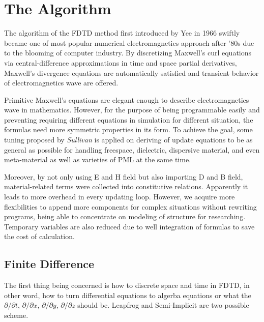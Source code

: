 \section{The Algorithm}
The algorithm of the FDTD method first introduced by Yee in 1966 swiftly became one of most popular numerical
electromagnetics approach after '80s due to the blooming of computer industry. By discretizing Maxwell's curl equations
via central-difference approximations in time and space partial derivatives, Maxwell's divergence equations are
automatically satisfied and transient behavior of electromagnetics wave are offered.

Primitive Maxwell's equations are elegant enough to describe electromagnetics wave in mathematics. However, for the
purpose of being programmable easily and preventing requiring different equations in simulation for different situation,
the formulas need more symmetric properties in its form. To achieve the goal, some tuning proposed by \textit{Sullivan}
is applied on deriving of update equations to be as general as possible for handling freespace, dielectric, dispersive
material, and even meta-material as well as varieties of PML at the same time.

Moreover, by not only using E and H field but also importing D and B field, material-related terms were collected into
constitutive relations. Apparently it leads to more overhead in every updating loop. However, we acquire more
flexibilities to append more components for complex situations without rewriting programs, being able to concentrate on
modeling of structure for researching. Temporary variables are also reduced due to well integration of formulas to save
the cost of calculation.


\subsection{Finite Difference}
The first thing being concerned is how to discrete space and time in FDTD, in other word, how to turn differential
equations to algerba equations or what the $\partial/\partial t$, $\partial/\partial x$, $\partial/\partial y$,
$\partial/\partial z$ should be. Leapfrog and Semi-Implicit are two possible scheme.
